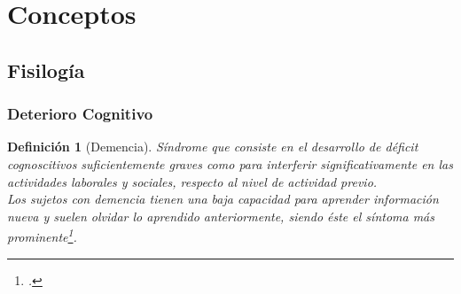 \documentclass[serif,mathserif,professionalfont]{beamer}
\newtheorem{definicion}{Definición}
\begin{document}




\section{Conceptos}

\subsection{Fisilogía}

\begin{frame}\frametitle{Deterioro Cognitivo}
\begin{definicion}[Demencia]
Síndrome que consiste en el desarrollo de déficit cognoscitivos 
suficientemente graves como para interferir significativamente en las actividades laborales y 
sociales, respecto al nivel de actividad previo. \\
Los sujetos con demencia tienen una baja capacidad para aprender información nueva y suelen olvidar 
lo aprendido anteriormente, siendo éste el síntoma más prominente\footcite{DCM5}.
\end{definicion}
\end{frame}
\end{document}

